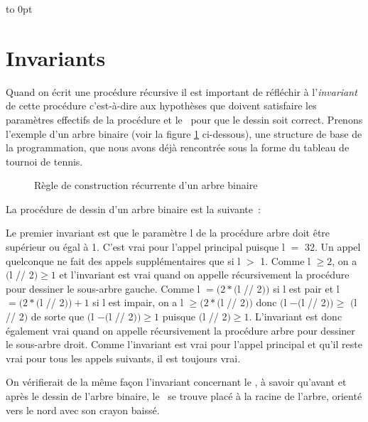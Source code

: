  {
 \vbox to 0pt{\vspace*{3cm}}%
 
 }
\section{Invariants}
Quand on écrit une procédure récursive il est important de réfléchir à l'{\em in\-va\-riant\/} 
de cette procédure c'est-à-dire aux hypothèses que doivent satisfaire les paramètres
effectifs de la procédure et le \robot\ pour que le dessin soit correct. Prenons l'exemple d'un
arbre binaire (voir la figure \ref{fig:arbin} ci-dessous), une structure de base de la
programmation, que nous avons déjà rencontrée sous la forme du tableau de tournoi de tennis. 
\begin{figure}[htbp]
 \caption{Règle de construction récurrente d'un arbre binaire}\label{fig:arbin}
\end{figure}

\noindent La procédure de dessin d'un arbre binaire est la suivante~:



Le premier invariant est que le paramètre {\idt l} de la procédure {\idt arbre} doit être 
supérieur ou égal à 1. C'est
vrai pour l'appel principal puisque {\idt l} $=$ 32. Un appel quelconque
ne fait des appels supplémentaires que si {\idt l} $>$ 1. Comme 
{\idt l} $\geq 2$, on a
$(${\idt l // 2}$) \geq 1$ et l'invariant est vrai quand on appelle récursivement la 
procédure pour dessiner le sous-arbre gauche. Comme 
{\idt l} $= (2 \ast (${\idt l // 2}$))$ 
si {\idt l} est pair et 
{\idt l} $= (2 \ast (${\idt l // 2}$)) + 1$
si {\idt l} est impair, on a
{\idt l} $\geq (2 \ast (${\idt l // 2}$))$ donc 
$(${\idt l} $- (${\idt l // 2}$)) \geq$ $(${\idt l // 2}$)$ de sorte que
$(${\idt l} $- (${\idt l // 2}$)) \geq 1$
puisque $(${\idt l // 2}$) \geq 1$. L'invariant est donc également vrai quand on appelle 
récursivement la 
procédure {\idt arbre} pour dessiner le sous-arbre droit. Comme l'invariant est vrai pour l'appel principal
et qu'il reste vrai pour tous les appels suivants, il est toujours vrai.

On vérifierait de la même façon l'invariant concernant le \robot, à savoir qu'avant et après
le dessin de l'arbre binaire, le \robot\ se trouve placé à la racine de l'arbre, orienté vers le nord avec son
crayon baissé.

